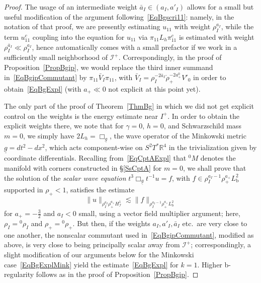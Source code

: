 \documentclass[reqno,11pt,letterpaper]{amsart}
\numberwithin{equation}{section}
\numberwithin{figure}{section}
\theoremstyle{definition}
\theoremstyle{remark}
\newcommand{\ms}{\mathscr}
\newcommand{\scri}{\ms I}
\newcommand{\R}{\mathbb{R}}
\newcommand{\ringrho}{\mathring\rho}
\newcommand{\ul}[1]{\underline{#1}{}}
\newcommand{\bop}{{\mathrm{b}}}
\newcommand{\Hscri}{H_{\scri}}
\begin{document}
\begin{proof}
  The usage of an intermediate weight $\bar a_I\in(a_I,a'_I)$ allows for a small but useful modification of the argument following~\eqref{EqBgscri11}: namely, in the notation of that proof, we are presently estimating $u_{1 1}$ with weight $\rho_I^{a_I}$, while the term $u_{1 1}^c$ coupling into the equation for $u_{1 1}$ via $\pi_{1 1}L_h\pi_{1 1}^c$ is estimated with weight $\rho_I^{\bar a_I}\ll\rho_I^{a_I}$, hence automatically comes with a small prefactor if we work in a sufficiently small neighborhood of $\scri^+$. Correspondingly, in the proof of Proposition~\ref{PropBgip}, we would replace the third inner summand in~\eqref{EqBgipCommutant} by $\pi_{1 1}\bar V_I\pi_{1 1}$, with $\bar V_I=\rho_I^{-2\bar a_I}\ringrho_+^{-2 a_+^0}V'_0$ in order to obtain~\eqref{EqBgExpl} (with $a_+\ll 0$ not explicit at this point yet).

  The only part of the proof of Theorem~\ref{ThmBg} in which we did not get explicit control on the weights is the energy estimate near $I^+$. In order to obtain the explicit weights there, we note that for $\gamma=0$, $h=0$, and Schwarzschild mass $m=0$, we simply have $2 L_h=\Box_{\ul g}$, the wave operator of the Minkowski metric $\ul g=dt^2-dx^2$, which acts component-wise on $S^2 T^*\R^4$ in the trivialization given by coordinate differentials. Recalling from~\eqref{EqCptAExpl} that ${}^0\!M$ denotes the manifold with corners constructed in \S\ref{SsCptA} for $m=0$, we shall prove that the solution of the \emph{scalar wave equation} $t^3\Box_{\ul g}t^{-1}u=f$, with $f\in\rho_I^{a_I-1}\rho_+^{a_+}L^2_\bop$ supported in $\rho_+<1$, satisfies the estimate
  \begin{equation}
  \label{EqBgExplMink}
    \|u\|_{\rho_I^{a_I}\rho_+^{a_+}\Hscri^1} \lesssim \|f\|_{\rho_I^{a_I-1}\rho_+^{a_+}L^2_\bop}
  \end{equation}
  for $a_+=-\tfrac32$ and $a_I<0$ small, using a vector field multiplier argument; here, $\rho_I={}^0\rho_I$ and $\rho_+={}^0\rho_+$. But then, if the weights $a_I,a'_I,\bar a_I$ etc.\ are very close to one another, the nonscalar commutant used in~\eqref{EqBgipCommutant}, modified as above, is very close to being principally scalar away from $\scri^+$; correspondingly, a slight modification of our arguments below for the Minkowski case~\eqref{EqBgExplMink} yield the estimate~\eqref{EqBgExpl} for $k=1$. Higher b-regularity follows as in the proof of Proposition~\ref{PropBgip}.


\end{proof}
\end{document}
